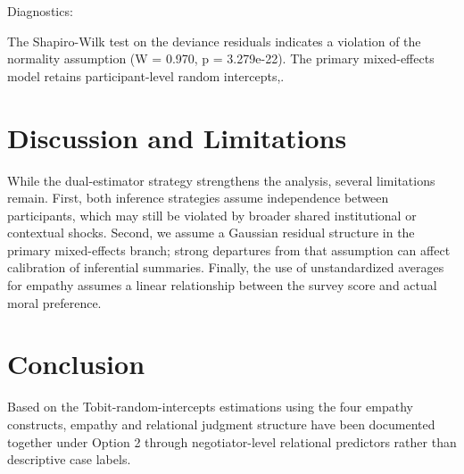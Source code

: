 \documentclass[11pt]{article}
\begin{document}
Diagnostics:

The Shapiro-Wilk test on the deviance residuals indicates a violation of the normality assumption (W = 0.970, p = 3.279e-22). The primary mixed-effects model retains participant-level random intercepts,.



\section{Discussion and Limitations}
While the dual-estimator strategy strengthens the analysis, several limitations remain. First, both inference strategies assume  independence between participants, which may still be violated by broader shared institutional or contextual shocks. Second, we assume a  Gaussian residual structure in the primary mixed-effects branch; strong departures from that assumption can affect calibration of inferential summaries.   Finally, the use of unstandardized averages for empathy assumes a linear relationship between the survey score and actual moral preference.

\section{Conclusion}
Based on the Tobit-random-intercepts estimations using the four empathy constructs, empathy and relational judgment structure have been documented together under Option 2 through negotiator-level relational predictors rather than descriptive case labels.
\end{document}
